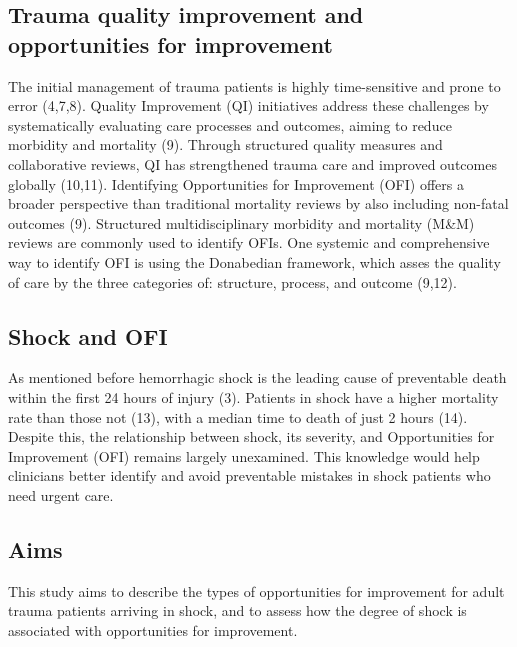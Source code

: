 \documentclass[
]{article}
\begin{document}
\hypertarget{trauma-quality-improvement-and-opportunities-for-improvement}{%
\subsection{Trauma quality improvement and opportunities for
improvement}\label{trauma-quality-improvement-and-opportunities-for-improvement}}

The initial management of trauma patients is highly time-sensitive and
prone to error (4,7,8). Quality Improvement (QI) initiatives address
these challenges by systematically evaluating care processes and
outcomes, aiming to reduce morbidity and mortality (9). Through
structured quality measures and collaborative reviews, QI has
strengthened trauma care and improved outcomes globally (10,11).
Identifying Opportunities for Improvement (OFI) offers a broader
perspective than traditional mortality reviews by also including
non-fatal outcomes (9). Structured multidisciplinary morbidity and
mortality (M\&M) reviews are commonly used to identify OFIs. One
systemic and comprehensive way to identify OFI is using the Donabedian
framework, which asses the quality of care by the three categories of:
structure, process, and outcome (9,12).

\hypertarget{shock-and-ofi}{%
\subsection{Shock and OFI}\label{shock-and-ofi}}

As mentioned before hemorrhagic shock is the leading cause of
preventable death within the first 24 hours of injury (3). Patients in
shock have a higher mortality rate than those not (13), with a median
time to death of just 2 hours (14). Despite this, the relationship
between shock, its severity, and Opportunities for Improvement (OFI)
remains largely unexamined. This knowledge would help clinicians better
identify and avoid preventable mistakes in shock patients who need
urgent care.

\hypertarget{aims}{%
\subsection{Aims}\label{aims}}

This study aims to describe the types of opportunities for improvement
for adult trauma patients arriving in shock, and to assess how the
degree of shock is associated with opportunities for improvement.
\end{document}
